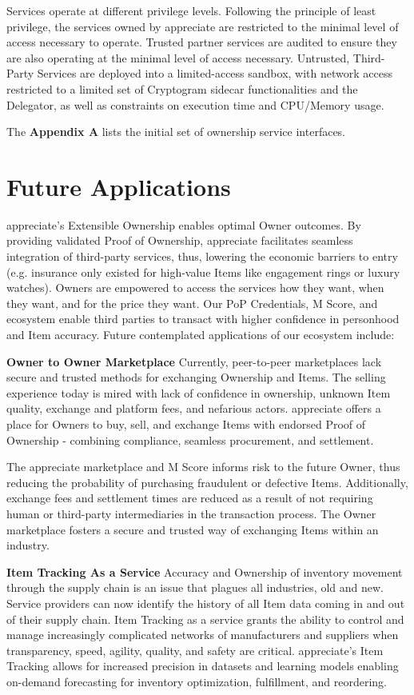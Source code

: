 \documentclass[a4paper,onecolumn, 10.5pt]{article}
\begin{document}
Services operate at different privilege levels. Following the principle of least privilege, the services owned by appreciate are restricted to the minimal level of access necessary to operate. Trusted partner services are audited to ensure they are also operating at the minimal level of access necessary. Untrusted, Third-Party Services are deployed into a limited-access sandbox, with network access restricted to a limited set of Cryptogram sidecar functionalities and the Delegator, as well as constraints on execution time and CPU/Memory usage.

The \textbf{Appendix A} lists the initial set of ownership service interfaces.

\section{Future Applications}

appreciate’s Extensible Ownership enables optimal Owner outcomes. By providing validated Proof of Ownership, appreciate facilitates seamless integration of third-party services, thus, lowering the economic barriers to entry (e.g. insurance only existed for high-value Items like engagement rings or luxury watches). Owners are empowered to access the services how they want, when they want, and for the price they want. Our PoP Credentials, M Score, and ecosystem enable third parties to transact with higher confidence in personhood and Item accuracy. Future contemplated applications of our ecosystem include:

\textbf{Owner to Owner Marketplace} \hfill \break
Currently, peer-to-peer marketplaces lack secure and trusted methods for exchanging Ownership and Items. The selling experience today is mired with lack of confidence in ownership, unknown Item quality, exchange and platform fees, and nefarious actors. appreciate offers a place for Owners to buy, sell, and exchange Items with endorsed Proof of Ownership - combining compliance, seamless procurement, and settlement. 

The appreciate marketplace and M Score informs risk to the future Owner, thus reducing the probability of purchasing fraudulent or defective Items. Additionally, exchange fees and settlement times are reduced as a result of not requiring human or third-party intermediaries in the transaction process. The Owner marketplace fosters a secure and trusted way of exchanging Items within an industry.

\newpage %
\textbf{Item Tracking As a Service} \hfill \break
Accuracy and Ownership of inventory movement through the supply chain is an issue that plagues all industries, old and new. Service providers can now identify the history of all Item data coming in and out of their supply chain. Item Tracking as a service grants the ability to control and manage increasingly complicated networks of manufacturers and suppliers when transparency, speed, agility, quality, and safety are critical. appreciate’s Item Tracking allows for increased precision in datasets and learning models enabling on-demand forecasting for inventory optimization, fulfillment, and reordering.
\end{document}
